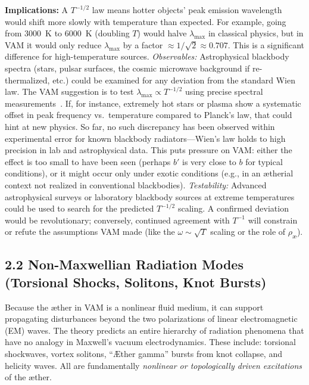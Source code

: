 \documentclass[a4paper,12pt]{article}
\begin{document}
\textbf{Implications:} A $T^{-1/2}$ law means hotter objects' peak emission wavelength would shift more slowly with temperature than expected. For example, going from 3000~K to 6000~K (doubling $T$) would halve $\lambda_{\max}$ in classical physics, but in VAM it would only reduce $\lambda_{\max}$ by a factor $\approx 1/\sqrt{2}\approx0.707$. This is a significant difference for high-temperature sources. \textit{Observables:} Astrophysical blackbody spectra (stars, pulsar surfaces, the cosmic microwave background if re-thermalized, etc.) could be examined for any deviation from the standard Wien law. The VAM suggestion is to test $\lambda_{\max}\propto T^{-1/2}$ using precise spectral measurements~\cite{vamblackbody}. If, for instance, extremely hot stars or plasma show a systematic offset in peak frequency vs.\ temperature compared to Planck's law, that could hint at new physics. So far, no such discrepancy has been observed within experimental error for known blackbody radiators---Wien's law holds to high precision in lab and astrophysical data. This puts pressure on VAM: either the effect is too small to have been seen (perhaps $b'$ is very close to $b$ for typical conditions), or it might occur only under exotic conditions (e.g., in an ætherial context not realized in conventional blackbodies). \textit{Testability:} Advanced astrophysical surveys or laboratory blackbody sources at extreme temperatures could be used to search for the predicted $T^{-1/2}$ scaling. A confirmed deviation would be revolutionary; conversely, continued agreement with $T^{-1}$ will constrain or refute the assumptions VAM made (like the $\omega\sim\sqrt{T}$ scaling or the role of $\rho_{\text{\ae}}$).


\subsection*{2.2 Non-Maxwellian Radiation Modes (Torsional Shocks, Solitons, Knot Bursts)}

Because the æther in VAM is a nonlinear fluid medium, it can support propagating disturbances beyond the two polarizations of linear electromagnetic (EM) waves. The theory predicts an entire hierarchy of radiation phenomena that have no analogy in Maxwell’s vacuum electrodynamics. These include: torsional shockwaves, vortex solitons, “Æther gamma” bursts from knot collapse, and helicity waves. All are fundamentally \textit{nonlinear or topologically driven excitations} of the æther.
\end{document}
